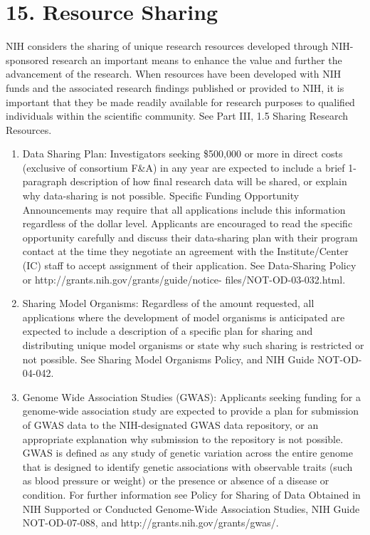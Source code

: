 \documentclass[11pt,notitlepage]{article}
\begin{document}
\section*{15. Resource Sharing}

NIH considers the sharing of unique research resources developed through NIH-sponsored research an important means to enhance the value and further the advancement of the research. When resources have been developed with NIH funds and the associated research findings published or provided to NIH, it is important that they be made readily available for research purposes to qualified individuals within the scientific community. See Part III, 1.5 Sharing Research Resources.

\begin{enumerate}
\item{Data Sharing Plan:} Investigators seeking \$500,000 or more in direct costs (exclusive of consortium F\&A) in any year are expected to include a brief 1-paragraph description of how final research data will be shared, or explain why data-sharing is not possible. Specific Funding Opportunity Announcements may require that all applications include this information regardless of the dollar level. Applicants are encouraged to read the specific opportunity carefully and discuss their data-sharing plan with their program contact at the time they negotiate an agreement with the Institute/Center (IC) staff to accept assignment of their application. See Data-Sharing Policy or http://grants.nih.gov/grants/guide/notice- files/NOT-OD-03-032.html.
\item{Sharing Model Organisms:} Regardless of the amount requested, all applications where the development of model organisms is anticipated are expected to include a description of a specific plan for sharing and distributing unique model organisms or state why such sharing is restricted or not possible. See Sharing Model Organisms Policy, and NIH Guide NOT-OD-04-042.
\item{Genome Wide Association Studies (GWAS):} Applicants seeking funding for a genome-wide association study are expected to provide a plan for submission of GWAS data to the NIH-designated GWAS data repository, or an appropriate explanation why submission to the repository is not possible. GWAS is defined as any study of genetic variation across the entire genome that is designed to identify genetic associations with observable traits (such as blood pressure or weight) or the presence or absence of a disease or condition. For further information see Policy for Sharing of Data Obtained in NIH Supported or Conducted Genome-Wide Association Studies, NIH Guide NOT-OD-07-088, and http://grants.nih.gov/grants/gwas/.
\end{enumerate}
\end{document}
